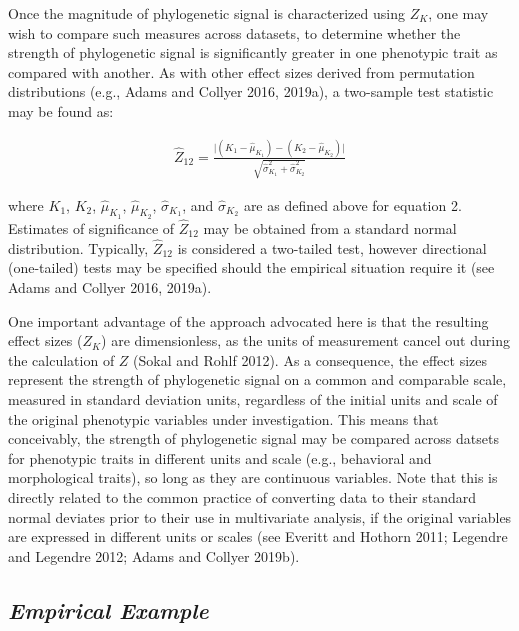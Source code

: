 \documentclass[
]{article}
\begin{document}
Once the magnitude of phylogenetic signal is characterized using
\(Z_K\), one may wish to compare such measures across datasets, to
determine whether the strength of phylogenetic signal is significantly
greater in one phenotypic trait as compared with another. As with other
effect sizes derived from permutation distributions (e.g., Adams and
Collyer 2016, 2019a), a two-sample test statistic may be found as:

\begin{align}
  \hat{Z}_{12}=\frac{\lvert{(K_{1}-\hat\mu_{K_1})-(K_{2}-\hat\mu_{K_2})}\rvert}{\sqrt{\hat\sigma^2_{K_1}+\hat\sigma^2_{K_2}}}
\end{align}

where \(K_1\), \(K_2\), \(\hat\mu_{K_1}\), \(\hat\mu_{K_2}\),
\(\hat\sigma_{K_1}\), and \(\hat\sigma_{K_2}\) are as defined above for
equation 2. Estimates of significance of \(\hat{Z}_{12}\) may be
obtained from a standard normal distribution. Typically,
\(\hat{Z}_{12}\) is considered a two-tailed test, however directional
(one-tailed) tests may be specified should the empirical situation
require it (see Adams and Collyer 2016, 2019a). \hfill\break

One important advantage of the approach advocated here is that the
resulting effect sizes (\(Z_K\)) are dimensionless, as the units of
measurement cancel out during the calculation of \(Z\) (Sokal and Rohlf
2012). As a consequence, the effect sizes represent the strength of
phylogenetic signal on a common and comparable scale, measured in
standard deviation units, regardless of the initial units and scale of
the original phenotypic variables under investigation. This means that
conceivably, the strength of phylogenetic signal may be compared across
datsets for phenotypic traits in different units and scale (e.g.,
behavioral and morphological traits), so long as they are continuous
variables. Note that this is directly related to the common practice of
converting data to their standard normal deviates prior to their use in
multivariate analysis, if the original variables are expressed in
different units or scales (see Everitt and Hothorn 2011; Legendre and
Legendre 2012; Adams and Collyer 2019b).

\hypertarget{empirical-example}{%
\subsection{\texorpdfstring{\emph{Empirical
Example}}{Empirical Example}}\label{empirical-example}}
\end{document}
